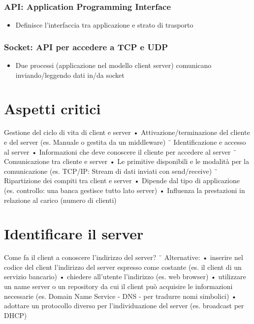 \subsubsection{API: Application Programming Interface}
\begin{itemize}
    \item Definisce l'interfaccia tra applicazione e strato di trasporto
\end{itemize}
\subsubsection{Socket: API per accedere a TCP e UDP}
\begin{itemize}
    \item Due processi (applicazione nel modello client server) comunicano inviando/leggendo dati in/da socket
\end{itemize}

\section{Aspetti critici}
Gestione del ciclo di vita di client e server
• Attivazione/terminazione del cliente e del server
(es. Manuale o gestita da un middleware)
¨ Identificazione e accesso al server
• Informazioni che deve conoscere il cliente per accedere al server
¨ Comunicazione tra cliente e server
• Le primitive disponibili e le modalità per la comunicazione
(es. TCP/IP: Stream di dati inviati con send/receive)
¨ Ripartizione dei compiti tra client e server
• Dipende dal tipo di applicazione
(es. controllo: una banca gestisce tutto lato server)
• Influenza la prestazioni in relazione al carico (numero di clienti)

\section{Identificare il server}
Come fa il client a conoscere l'indirizzo del server?
¨ Alternative:
• inserire nel codice del client l'indirizzo del server espresso come costante
(es. il client di un servizio bancario)
• chiedere all'utente l'indirizzo (es. web browser)
• utilizzare un name server o un repository da cui il client può acquisire le
informazioni necessarie
(es. Domain Name Service - DNS - per tradurre nomi simbolici)
• adottare un protocollo diverso per l'individuazione del server
(es. broadcast per DHCP)

